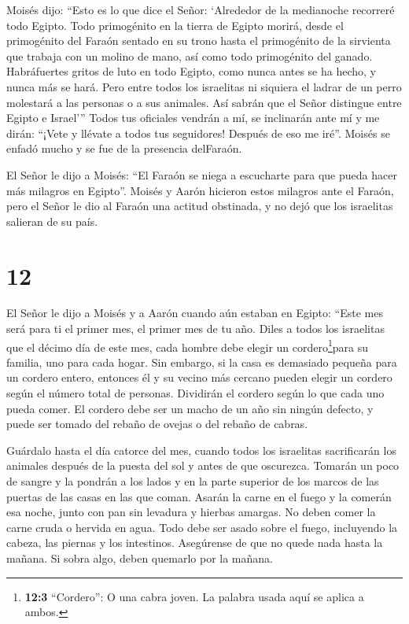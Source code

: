  Moisés dijo: ``Esto es lo que dice el Señor: `Alrededor de
la medianoche recorreré todo Egipto.  Todo primogénito en la
tierra de Egipto morirá, desde el primogénito del Faraón sentado en su
trono hasta el primogénito de la sirvienta que trabaja con un molino de
mano, así como todo primogénito del ganado.  Habráfuertes
gritos de luto en todo Egipto, como nunca antes se ha hecho, y nunca más
se hará.  Pero entre todos los israelitas ni siquiera el
ladrar de un perro molestará a las personas o a sus animales. Así sabrán
que el Señor distingue entre Egipto e Israel'''  Todos tus
oficiales vendrán a mí, se inclinarán ante mí y me dirán: ``¡Vete y
llévate a todos tus seguidores! Después de eso me iré''. Moisés se
enfadó mucho y se fue de la presencia delFaraón.

 El Señor le dijo a Moisés: ``El Faraón se niega a
escucharte para que pueda hacer más milagros en Egipto''. 
Moisés y Aarón hicieron estos milagros ante el Faraón, pero el Señor le
dio al Faraón una actitud obstinada, y no dejó que los israelitas
salieran de su país.

\hypertarget{section-11}{%
\section{12}\label{section-11}}

 El Señor le dijo a Moisés y a Aarón cuando aún estaban en
Egipto:  ``Este mes será para ti el primer mes, el primer
mes de tu año.  Diles a todos los israelitas que el décimo
día de este mes, cada hombre debe elegir un cordero\footnote{\textbf{12:3}
  ``Cordero'': O una cabra joven. La palabra usada aquí se aplica a
  ambos.}para su familia, uno para cada hogar.  Sin embargo,
si la casa es demasiado pequeña para un cordero entero, entonces él y su
vecino más cercano pueden elegir un cordero según el número total de
personas. Dividirán el cordero según lo que cada uno pueda comer.
 El cordero debe ser un macho de un año sin ningún defecto,
y puede ser tomado del rebaño de ovejas o del rebaño de cabras.

 Guárdalo hasta el día catorce del mes, cuando todos los
israelitas sacrificarán los animales después de la puesta del sol y
antes de que oscurezca.  Tomarán un poco de sangre y la
pondrán a los lados y en la parte superior de los marcos de las puertas
de las casas en las que coman.  Asarán la carne en el fuego
y la comerán esa noche, junto con pan sin levadura y hierbas amargas.
 No deben comer la carne cruda o hervida en agua. Todo debe
ser asado sobre el fuego, incluyendo la cabeza, las piernas y los
intestinos.  Asegúrense de que no quede nada hasta la
mañana. Si sobra algo, deben quemarlo por la mañana.

